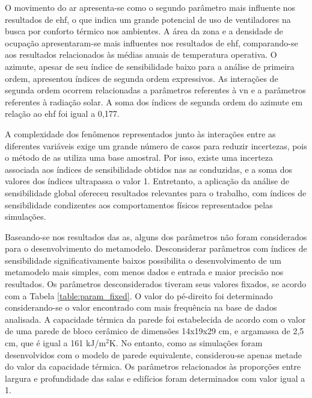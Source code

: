 \documentclass[brazil,hardcopy,openany]{ufscthesis} %
\begin{document}
O movimento do ar apresenta-se como o segundo parâmetro mais influente nos resultados de \acrshort{ehf}, o que indica um grande potencial de uso de ventiladores na busca por conforto térmico nos ambientes. 
A área da zona e a densidade de ocupação apresentaram-se mais influentes nos resultados de \acrshort{ehf}, comparando-se aos resultados relacionados às médias anuais de temperatura operativa.
O azimute, apesar de seu índice de sensibilidade baixo para a análise de primeira ordem, apresentou índices de segunda ordem expressivos. As interações de segunda ordem ocorrem relacionadas a parâmetros referentes à \acrshort{vn} e a parâmetros referentes à radiação solar. A soma dos índices de segunda ordem do azimute em relação ao \acrshort{ehf} foi igual a 0,177.  %

A complexidade dos fenômenos representados junto às interações entre as diferentes variáveis exige um grande número de casos para reduzir incertezas, pois o método de \acrshort{as} utiliza uma base amostral. Por isso, existe uma incerteza associada aos índices de sensibilidade obtidos nas \acrshort{as} conduzidas, e a soma dos valores dos índices ultrapassa o valor 1. Entretanto, a aplicação da análise de sensibilidade global ofereceu resultados relevantes para o trabalho, com índices de sensibilidade condizentes aos comportamentos físicos representados pelas simulações. 

Baseando-se nos resultados das \acrshort{as}, alguns dos parâmetros não foram considerados para o desenvolvimento do metamodelo. Desconsiderar parâmetros com índices de sensibilidade significativamente baixos possibilita o desenvolvimento de um metamodelo mais simples, com menos dados e entrada e maior precisão nos resultados. Os parâmetros desconsiderados tiveram seus valores fixados, se acordo com a Tabela \ref{table:param_fixed}. O valor do pé-direito foi determinado considerando-se o valor encontrado com mais frequência na base de dados analisada. A capacidade térmica da parede foi estabelecida de acordo com o valor de uma parede de bloco cerâmico de dimensões 14x19x29 cm, e argamassa de 2,5 cm, que é igual a 161 kJ/m$^2$K. No entanto, como as simulações foram desenvolvidos com o modelo de parede equivalente, considerou-se apenas metade do valor da capacidade térmica. Os parâmetros relacionados às proporções entre largura e profundidade das salas e edifícios foram determinados com valor igual a 1. 
\end{document}
